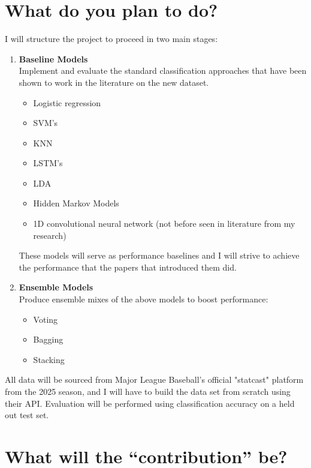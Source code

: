 \documentclass{article}
\begin{document}
\section{What do you plan to do?}
I will structure the project to proceed in two main stages:

\begin{enumerate}
    \item \textbf{Baseline Models} \\
    Implement and evaluate the standard classification approaches that have been shown to work in the literature on the new dataset. 
    \begin{itemize}
        \item Logistic regression
        \item SVM's
        \item KNN
        \item LSTM's
        \item LDA
        \item Hidden Markov Models
        \item 1D convolutional neural network (not before seen in literature from my research)
    \end{itemize}
    These models will serve as performance baselines and I will strive to achieve the performance that the papers that introduced them did.

    \item \textbf{Ensemble Models} \\
    Produce ensemble mixes of the above models to boost performance:
    \begin{itemize}
        \item Voting
        \item Bagging
        \item Stacking
    \end{itemize}


\end{enumerate}

All data will be sourced from Major League Baseball’s official "statcast" platform from the 2025 season, and I will have to build the data set from scratch using their API. Evaluation will be performed using classification accuracy on a held out test set.




\section{What will the “contribution” be?}
\end{document}
